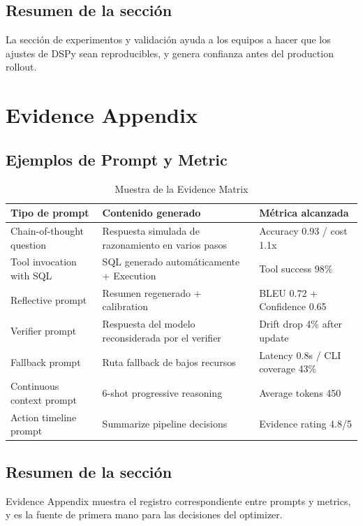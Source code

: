 \documentclass[a4paper]{article}
\begin{document}
\subsection{Resumen de la sección}

La sección de experimentos y validación ayuda a los equipos a hacer que los ajustes de DSPy sean reproducibles, y genera confianza antes del production rollout.

\section{Evidence Appendix}

\subsection{Ejemplos de Prompt y Metric}

\begin{table}[H]
\centering
\caption{Muestra de la Evidence Matrix}
\begin{tabular}{p{}p{}p{}}
\toprule
Tipo de prompt & Contenido generado & Métrica alcanzada \\
\midrule
Chain-of-thought question & Respuesta simulada de razonamiento en varios pasos & Accuracy 0.93 / cost 1.1x \\
Tool invocation with SQL & SQL generado automáticamente + Execution & Tool success 98\% \\
Reflective prompt & Resumen regenerado + calibration & BLEU 0.72 + Confidence 0.65 \\
Verifier prompt & Respuesta del modelo reconsiderada por el verifier & Drift drop 4\% after update \\
Fallback prompt & Ruta fallback de bajos recursos & Latency 0.8s / CLI coverage 43\% \\
Continuous context prompt & 6-shot progressive reasoning & Average tokens 450 \\
Action timeline prompt & Summarize pipeline decisions & Evidence rating 4.8/5 \\
\bottomrule
\end{tabular}
\end{table}

\subsection{Resumen de la sección}

Evidence Appendix muestra el registro correspondiente entre prompts y metrics, y es la fuente de primera mano para las decisiones del optimizer.
\end{document}
